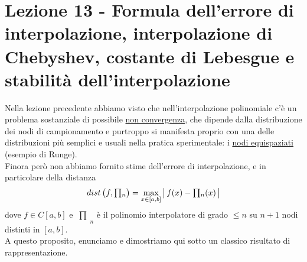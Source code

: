 \documentclass[12pt]{article}
\DeclarePairedDelimiter{\abs}{\lvert}{\rvert}
\newcommand{\inter}{\begin{matrix}\prod\end{matrix}}
\begin{document}
\section[Lezione 13 - Stabilità dell'interpolazione]{Lezione 13 - Formula dell'errore di interpolazione, interpolazione di Chebyshev, costante di Lebesgue e stabilità dell'interpolazione}

Nella lezione precedente abbiamo visto che nell'interpolazione polinomiale c'è un problema sostanziale di possibile \uline{non convergenza}, che dipende dalla distribuzione dei nodi di campionamento e purtroppo si manifesta proprio con una delle distribuzioni più semplici e usuali nella pratica sperimentale: i \uline{nodi equispaziati} (esempio di Runge).\\
Finora però non abbiamo fornito stime dell'errore di interpolazione, e in particolare della distanza
\[dist \left(f,\inter_n \right) = \max_{x \in [a,b]}\, \abs*{\,f(x) - \inter_n(x)\,}\]
dove $f \in C[a,b]$ e $\inter_n$ è il polinomio interpolatore di grado $\le n$ su $n+1$ nodi distinti in $[a,b]$.\\
A questo proposito, enunciamo e dimostriamo qui sotto un classico risultato di rappresentazione.
\end{document}
